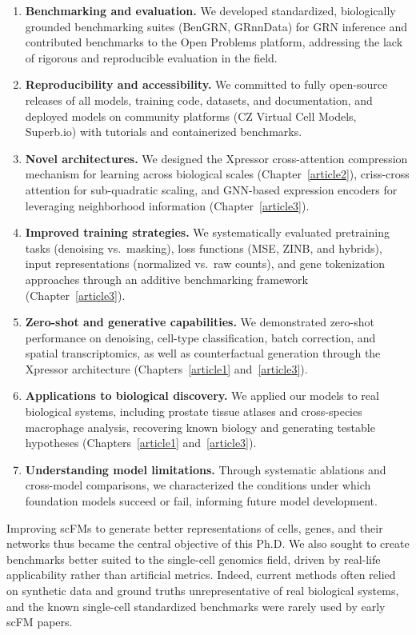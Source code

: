 \begin{enumerate}
  \item \textbf{Benchmarking and evaluation.} We developed standardized, biologically grounded
    benchmarking suites (BenGRN, GRnnData) for \gls{GRN} inference and contributed benchmarks to
    the Open Problems platform, addressing the lack of rigorous and reproducible evaluation in the
    field.
  \item \textbf{Reproducibility and accessibility.} We committed to fully open-source releases of
    all models, training code, datasets, and documentation, and deployed models on community
    platforms (CZ Virtual Cell Models, Superb.io) with tutorials and containerized benchmarks.
  \item \textbf{Novel architectures.} We designed the Xpressor cross-attention compression
    mechanism for learning across biological scales (Chapter~\ref{article2}), criss-cross attention
    for sub-quadratic scaling, and \gls{GNN}-based expression encoders for leveraging neighborhood
    information (Chapter~\ref{article3}).
  \item \textbf{Improved training strategies.} We systematically evaluated pretraining tasks
    (denoising vs.\ masking), loss functions (\gls{MSE}, \gls{ZINB}, and hybrids), input
    representations (normalized vs.\ raw counts), and gene tokenization approaches through an
    additive benchmarking framework (Chapter~\ref{article3}).
  \item \textbf{Zero-shot and generative capabilities.} We demonstrated zero-shot performance on
    denoising, cell-type classification, batch correction, and spatial transcriptomics, as well as
    counterfactual generation through the Xpressor architecture
    (Chapters~\ref{article1} and~\ref{article3}).
  \item \textbf{Applications to biological discovery.} We applied our models to real biological
    systems, including prostate tissue atlases and cross-species macrophage analysis, recovering
    known biology and generating testable hypotheses (Chapters~\ref{article1} and~\ref{article3}).
  \item \textbf{Understanding model limitations.} Through systematic ablations and cross-model
    comparisons, we characterized the conditions under which foundation models succeed or fail,
    informing future model development.
\end{enumerate}

Improving \glspl{scFM} to generate better representations of cells, genes, and their networks thus
became the central objective of this Ph.D. We also sought to create benchmarks better suited to
the single-cell genomics field, driven by real-life applicability rather than artificial metrics.
Indeed, current methods often relied on synthetic data and ground truths unrepresentative of real
biological systems, and the known single-cell standardized benchmarks were rarely used by early
\gls{scFM} papers.

